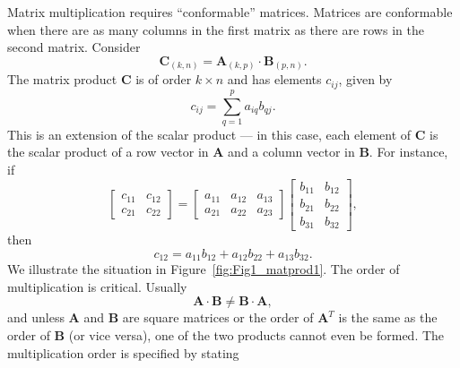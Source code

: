 Matrix multiplication requires ``conformable'' matrices. Matrices are conformable when 
there are as many columns in the first matrix as there are rows in the second matrix.  Consider
\begin{equation}
\mathbf{C}_{(k,n)} = \mathbf{A}_{(k,p)} \cdot \mathbf{B}_{(p,n)}.
\end{equation}	 
The matrix product $\mathbf{C}$ is of order $k \times n$ and has elements $c_{ij}$, given by
\begin{equation}
c_{ij} = \sum^p _{q=1} a_{iq}b_{qj}.
\end{equation}	 
This is an extension of the scalar product --- in this case, each element of $\mathbf{C}$ is the scalar product of a row 
vector in $\mathbf{A}$ and a column vector in $\mathbf{B}$.  For instance, if
\begin{equation}
\left[
\begin{array}{cc}
c_{11} & c_{12} \\
c_{21} & c_{22} 
\end{array}
\right ]
=
\left[
\begin{array}{ccc}
a_{11}&  a_{12} &  a_{13}\\
a_{21}&  a_{22} &  a_{23}
\end{array}
\right ]
\left [
\begin{array}{cc}
b_{11} & b_{12}\\
b_{21} & b_{22}\\
b_{31} & b_{32}
\end{array}
\right],
\end{equation}
then
\begin{equation}
c_{12} = a_{11}b_{12} + a_{12}b_{22} + a_{13}b_{32}.
\end{equation}
We illustrate the situation in Figure~\ref{fig:Fig1_matprod1}.
The order of multiplication is critical. Usually
\begin{equation}
\mathbf{A \cdot B \neq B \cdot A},
\end{equation}	 
and unless $\mathbf{A}$ and $\mathbf{B}$ are square matrices or the order of $\mathbf{A}^T$ is the same as the order of $\mathbf{B}$ (or vice 
versa), one of the two products cannot even be formed. The multiplication order is specified by stating

